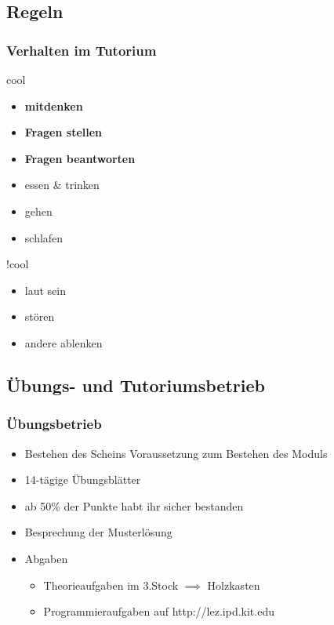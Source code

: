 \documentclass[18pt]{beamer}
\begin{document}
	\subsection{Regeln}
		\begin{frame}
			\frametitle{Verhalten im Tutorium}
			\begin{block}{cool}
				\begin{itemize}
					\item \textbf{mitdenken}
					\item \textbf{Fragen stellen}
					\item \textbf{Fragen beantworten}
					\item essen \& trinken
					\item gehen
					\item schlafen
				\end{itemize}
			\end{block}
			\pause
			\begin{block}{!cool}
				\begin{itemize}
					\item laut sein
					\item stören
					\item andere ablenken
				\end{itemize}
			\end{block}
		\end{frame}
		
	\subsection{Übungs- und Tutoriumsbetrieb}
		\begin{frame}
			\frametitle{Übungsbetrieb}
			\begin{itemize}
				\item Bestehen des Scheins Voraussetzung zum Bestehen des Moduls \pause
				\item 14-tägige Übungsblätter \pause
				\item ab 50\% der Punkte habt ihr sicher bestanden \pause
				\item Besprechung der Musterlösung
				\pause
				\item Abgaben
					\begin{itemize}
						\item Theorieaufgaben im 3.Stock $\implies$ Holzkasten
						\item Programmieraufgaben auf http://lez.ipd.kit.edu 
					\end{itemize}
			\end{itemize}
		\end{frame}
	
\end{document}
